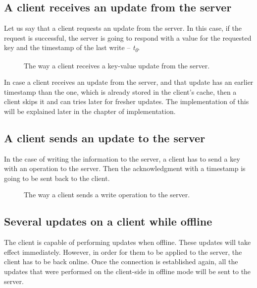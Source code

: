 \subsection{A client receives an update from the server}

Let us say that a client requests an update from the server. In this case, if the request is successful, the server is going to respond with a value for the requested key and the timestamp of the last write -- \textit{t\textsubscript{0}}.

\begin{figure}[!htb]
    \begin{center}
    \def\svgwidth{\linewidth}
    
    \caption {The way a client receives a key-value update from the server.}
    \label{fig:design2}
\end{center}
\end{figure}

In case a client receives an update from the server, and that update has an earlier timestamp than the one, which is already stored in the client's cache, then a client skips it and can tries later for fresher updates. The implementation of this will be explained later in the chapter of implementation.

\subsection{A client sends an update to the server}

In the case of writing the information to the server, a client has to send a key with an operation to the server. Then the acknowledgment with a timestamp is going to be sent back to the client.

\begin{figure}[!htb]
    \begin{center}
    \def\svgwidth{\linewidth}
    
    \caption {The way a client sends a write operation to the server.}
    \label{fig:design3}
\end{center}
\end{figure}

\subsection*{Several updates on a client while offline}

The client is capable of performing updates when offline. These updates will take effect immediately. However, in order for them to be applied to the server, the client has to be back online. Once the connection is established again, all the updates that were performed on the client-side in offline mode will be sent to the server.

